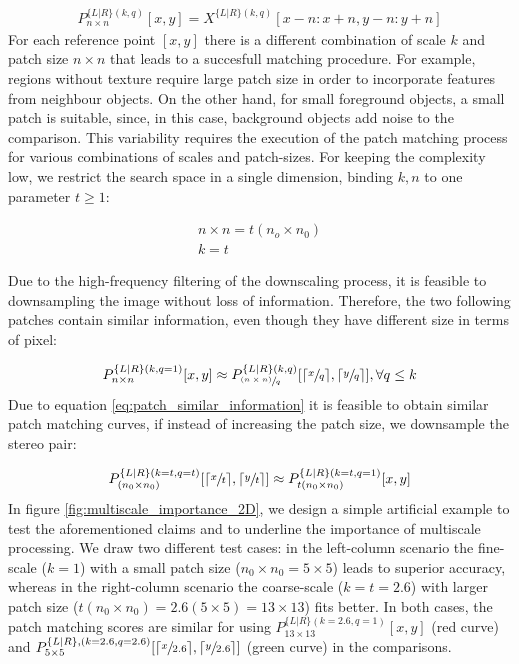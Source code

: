 \documentclass[runningheads]{llncs}
\begin{document}
\begin{gather}
    P^{ \{L|R\} (k,q)}_{n \times n}[x,y] = X^{ \{ L|R \}(k,q)} [x-n:x+n, y-n:y+n]
\end{gather}
%
For each reference point $[x,y]$ there is a different combination of scale $k$ and patch size $n \times n$ that leads to a succesfull matching procedure. For example, regions without texture require large patch size in order to incorporate features from neighbour objects. On the other hand, for small foreground objects, a small patch is suitable, since, in this case, background objects add noise to the comparison. This variability requires the execution of the patch matching process for various combinations of scales and patch-sizes. For keeping the complexity low, we restrict the search space in a single dimension, binding $k, n$ to one parameter $t\geq1$:

\begin{gather}
    n \times n = t(n_o \times n_0) \label{eq:t_param1}\\
    k = t \label{eq:t_param2}
\end{gather}

Due to the high-frequency filtering of the downscaling process, it is feasible to downsampling the image without loss of information. Therefore, the two following patches contain similar information, even though they have different size in terms of pixel:

\begin{gather} \label{eq:patch_similar_information}
    P^{ \{L|R\} (k,q=1)}_{n \times n}[x,y] \approx P^{ \{L|R\} (k,q)}_{\sfrac{(n \times n)}{q}}[\lceil \sfrac{x}{q} \rceil,\lceil \sfrac{y}{q} \rceil], \forall q \leq k
\end{gather}{}
%
Due to equation \ref{eq:patch_similar_information} it is feasible to obtain similar patch matching curves, if instead of increasing the patch size, we downsample the stereo pair:

\begin{gather} \label{eq:patch_similar_information1}
     P^{ \{L|R\} (k = t, q = t)}_{(n_0 \times n_0)}[\lceil \sfrac{x}{t} \rceil, \lceil \sfrac{y}{t} \rceil] \approx P^{ \{L|R\} (k = t, q = 1)}_{t(n_0 \times n_0)}[x,y] 
\end{gather}{}
%
In figure \ref{fig:multiscale_importance_2D}, we design a simple artificial example to test the aforementioned claims and to underline the importance of multiscale processing. We draw two different test cases: in the left-column scenario the fine-scale ($k=1$) with a small patch size ($n_0 \times n_0 = 5 \times 5$) leads to superior accuracy, whereas in the right-column scenario the coarse-scale ($k=t=2.6$) with larger patch size ($t(n_0 \times n_0) = 2.6(5 \times 5) =13 \times 13$) fits better. In both cases, the patch matching scores are similar for using $ P^{ \{L|R\} (k = 2.6, q = 1)}_{13 \times 13}[x,y] $ (red curve) and $P^{ \{L|R\}, (k = 2.6, q = 2.6)}_{5 \times 5}[\lceil \sfrac{x}{2.6} \rceil, \lceil \sfrac{y}{2.6} \rceil ]$ (green curve) in the comparisons.
\end{document}

